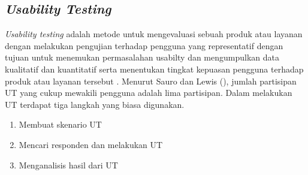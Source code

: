	\subsection{\textit{Usability Testing}}
	\textit{Usability testing} adalah metode untuk mengevaluasi sebuah produk atau layanan dengan melakukan pengujian terhadap pengguna yang representatif dengan tujuan untuk menemukan permasalahan usabilty dan mengumpulkan data kualitatif dan kuantitatif serta menentukan tingkat kepuasan pengguna terhadap produk atau layanan tersebut \citep{article.usability}.
	\linebreak\linebreak
	Menurut Sauro dan Lewis (\citeyear{papper.lewis}), jumlah partisipan UT yang cukup mewakili pengguna adalah lima partisipan. Dalam melakukan UT terdapat tiga langkah yang biasa digunakan.
	\begin{enumerate}
		\item Membuat skenario UT
		\item Mencari responden dan melakukan UT
		\item Menganalisis hasil dari UT
	\end{enumerate}